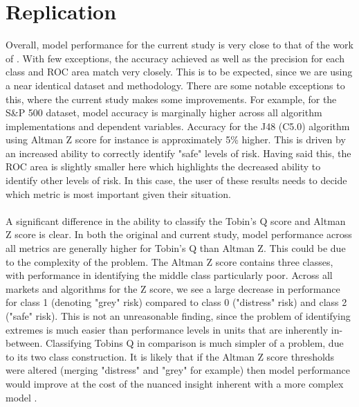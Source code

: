 \section{Replication}\label{S.Discussion.replication}
Overall, model performance for the current study is very close to that of the work of \cite{moldovan2015learning}. With few exceptions, the accuracy achieved as well as the precision for each class and ROC area match very closely. This is to be expected, since we are using a near identical dataset and methodology. There are some notable exceptions to this, where the current study makes some improvements. For example, for the S\&P 500 dataset, model accuracy is marginally higher across all algorithm implementations and dependent variables. Accuracy for the J48 (C5.0) algorithm using Altman Z score for instance is approximately 5\% higher. This is driven by an increased ability to correctly identify "safe" levels of risk. Having said this, the ROC area is slightly smaller here which highlights the decreased ability to identify other levels of risk. In this case, the user of these results needs to decide which metric is most important given their situation. \\\\
A significant difference in the ability to classify the Tobin's Q score and Altman Z score is clear. In both the original and current study, model performance across all metrics are generally higher for Tobin's Q than Altman Z. This could be due to the complexity of the problem. The Altman Z score contains three classes, with performance in identifying the middle class particularly poor. Across all markets and algorithms for the Z score, we see a large decrease in performance for class 1 (denoting "grey" risk) compared to class 0 ("distress" risk) and class 2 ("safe" risk). This is not an unreasonable finding, since the problem of identifying extremes is much easier than performance levels in units that are inherently in-between. Classifying Tobins Q in comparison is much simpler of a problem, due to its two class construction. It is likely that if the Altman Z score thresholds were altered (merging "distress" and "grey" for example) then model performance would improve at the cost of the nuanced insight inherent with a more complex model .\\\\
